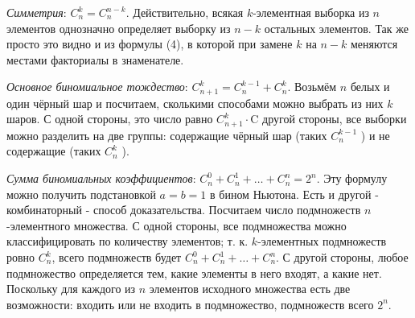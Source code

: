 \textit{Симметрия}: $C_n^k=C_n^{n-k}$. Действительно, всякая $k$-элементная выборка из $n$ элементов однозначно определяет выборку из $n-k$ остальных элементов. Так же просто это видно и из формулы (4), в которой при замене $k$ на $n-k$ меняются местами факториалы в знаменателе.

\textit{Основное биномиальное тождество}: $C_{n+1}^k=C_n^{k-1}+C_n^k$. Возьмём $n$ белых и один чёрный шар и посчитаем, сколькими способами можно выбрать из них $k$ шаров. С одной стороны, это число равно $C_{n+1}^k \cdot \mathrm{C}$ другой стороны, все выборки можно разделить на две группы: содержащие чёрный шар (таких $C_n^{k-1}$ ) и не содержащие (таких $C_n^k$ ).

\textit{Сумма биномиальных коэффициентов}: $C_n^0+C_n^1+\ldots+C_n^n=2^n$. Эту формулу можно получить подстановкой $a=b=1$ в бином Ньютона. Есть и другой - комбинаторный - способ доказательства. Посчитаем число подмножеств $n$-элементного множества. С одной стороны, все подмножества можно классифицировать по количеству элементов; т. к. $k$-элементных подмножеств ровно $C_n^k$, всего подмножеств будет $C_n^0+C_n^1+\ldots+C_n^n$. С другой стороны, любое подмножество определяется тем, какие элементы в него входят, а какие нет. Поскольку для каждого из $n$ элементов исходного множества есть две возможности: входить или не входить в подмножество, подмножеств всего $2^n$.